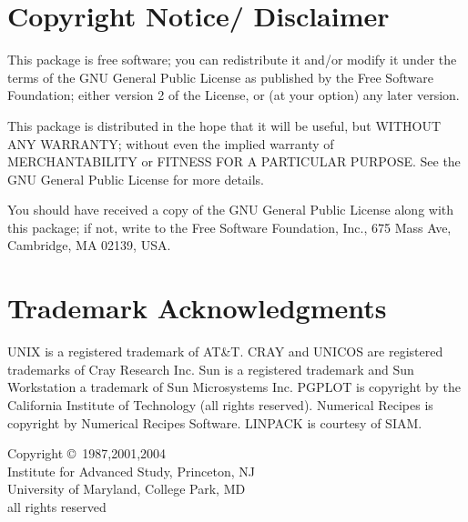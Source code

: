 \small
\section*{Copyright Notice/ Disclaimer}

This package is free software; you can redistribute it and/or modify
it under the terms of the GNU General Public License as published by
the Free Software Foundation; either version 2 of the License, or
(at your option) any later version.

This package is distributed in the hope that it will be useful,
but WITHOUT ANY WARRANTY; without even the implied warranty of
MERCHANTABILITY or FITNESS FOR A PARTICULAR PURPOSE.  See the
GNU General Public License for more details.

You should have received a copy of the GNU General Public License
along with this package; if not, write to the Free Software
Foundation, Inc., 675 Mass Ave, Cambridge, MA 02139, USA.


\section*{Trademark Acknowledgments}
UNIX is a registered trademark of AT\&T.
CRAY and UNICOS are registered trademarks of Cray Research Inc.
Sun is a registered trademark and Sun Workstation a trademark of Sun
Microsystems Inc.
PGPLOT is copyright by the California Institute of Technology (all
rights reserved).
Numerical Recipes is copyright by Numerical Recipes Software.
LINPACK is courtesy of SIAM.


\begin{center}
\vspace{2 in}
Copyright \copyright\ 1987,2001,2004\\
Institute for Advanced Study, Princeton, NJ\\
University of Maryland, College Park, MD\\
all rights reserved
\end{center}
\normalsize
\vspace*{\fill}
\cleardoublepage
\pagestyle{headings}
\tableofcontents
\newpage
{}
\listoftables
\newpage
{}
\listoffigures
\newpage

